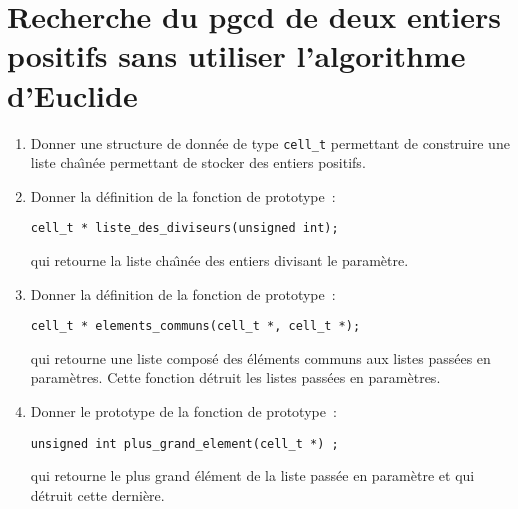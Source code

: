 \section{Recherche du pgcd de deux entiers positifs sans utiliser l'algorithme d'Euclide}
\begin{enumerate}
\item Donner une structure de donn\'ee de type \verb+cell_t+ permettant de construire une liste cha\^\i{}n\'ee permettant de stocker des entiers positifs.
\item Donner la d\'efinition de la fonction de prototype~:
\begin{verbatim}
cell_t * liste_des_diviseurs(unsigned int);
\end{verbatim}
qui retourne la liste cha\^\i{}n\'ee des entiers divisant le param\`etre.
\item Donner la d\'efinition de la fonction de prototype~:
\begin{verbatim}
cell_t * elements_communs(cell_t *, cell_t *);
\end{verbatim}
qui retourne une liste compos\'e des \'el\'ements communs aux listes pass\'ees en param\`etres.
Cette fonction d\'etruit les listes pass\'ees en param\`etres.
\item Donner le prototype de la fonction de prototype~:
\begin{verbatim}
unsigned int plus_grand_element(cell_t *) ;
\end{verbatim} 
qui retourne le plus grand \'el\'ement de la liste pass\'ee en param\`etre et qui d\'etruit cette derni\`ere.
\end{enumerate}
